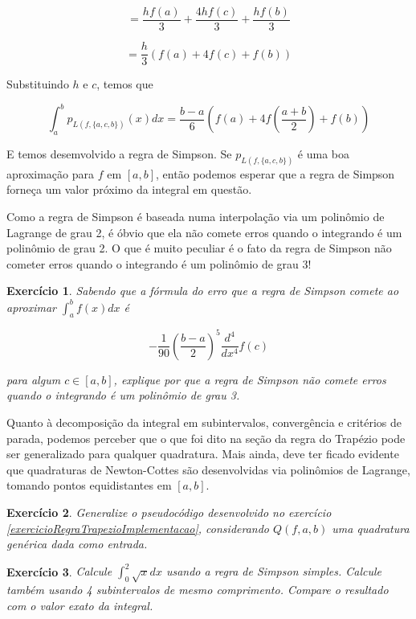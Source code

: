 \documentclass[]{article}
\newtheorem{exercicio}{Exercício}
\numberwithin{equation}{section}
\begin{document}
$$
= \frac{hf(a)}{3} + \frac{4hf(c)}{3} + \frac{hf(b)}{3}
$$

$$
= \frac{h}{3} (f(a) + 4f(c) + f(b))
$$

Substituindo $h$ e $c$, temos que

$$
\int_{a}^{b} p_{L(f, \{a, c, b\})}(x) dx = \frac{b - a}{6} \left(f(a) + 4f\left(\frac{a + b}{2}\right) + f(b)\right)
$$

E temos desemvolvido a regra de Simpson. Se $p_{L(f, \{a, c, b\})}$ é
uma boa aproximação para $f$ em $[a, b]$, então podemos esperar que a
regra de Simpson forneça um valor próximo da integral em questão.

Como a regra de Simpson é baseada numa interpolação via um polinômio
de Lagrange de grau 2, é óbvio que ela não comete erros quando o
integrando é um polinômio de grau 2. O que é muito peculiar é o fato
da regra de Simpson não cometer erros quando o integrando é um
polinômio de grau 3!

\begin{exercicio}
	Sabendo que a fórmula do erro que a regra de Simpson comete ao aproximar $\int_{a}^{b} f(x) dx$ é

$$
- \frac{1}{90} \left(\frac{b - a}{2}\right)^5 \frac{d^4}{dx^4} f(c)
$$

	para algum $c \in [a, b]$, explique por que a regra de Simpson não comete erros quando o integrando é um polinômio de grau 3.
\end{exercicio}

Quanto à decomposição da integral em subintervalos, convergência e
critérios de parada, podemos perceber que o que foi dito na seção da
regra do Trapézio pode ser generalizado para qualquer quadratura. Mais
ainda, deve ter ficado evidente que quadraturas de Newton-Cottes são
desenvolvidas via polinômios de Lagrange, tomando pontos equidistantes
em $[a, b]$.

\begin{exercicio}
  Generalize o pseudocódigo desenvolvido no exercício
  \ref{exercicioRegraTrapezioImplementacao}, considerando $Q(f, a, b)$
  uma quadratura genérica dada como entrada.
\end{exercicio}

\begin{exercicio}
  Calcule $\int_{0}^{2}\sqrt{x}dx$ usando a regra de Simpson
  simples. Calcule também usando 4 subintervalos de mesmo
  comprimento. Compare o resultado com o valor exato da integral.
\end{exercicio}
\end{document}
